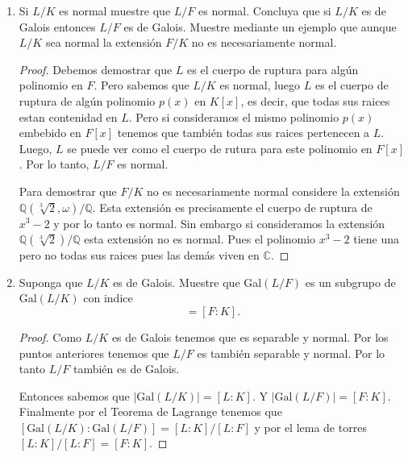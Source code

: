 \documentclass[letter,twoside,12pt]{article}
\begin{document}
\begin{enumerate}
\begin{enumerate}
\begin{proof}
Ahora para probar que $ L/F $ es separable tome cualquier elemento $ \alpha \in L $. Y tome el polinomio irreducible $ f(x) \in F[x] $. Pero si consideramos el polinomio irreducible $ k(x) $ de $ \alpha $ en $ K[x] $ tenemos que $ f(x)|k(x)  $. Luego, como $ k(x) $ no tiene raices repetidas concluimos que $ f(x) $ tampoco. Por lo tanto $ L/F $ es separable. 
\end{proof}

\item Si $ L/K $ es normal muestre que $ L/F $ es normal. Concluya que si $ L/K $ es de Galois entonces $ L/F $
es de Galois. Muestre mediante un ejemplo que aunque $ L/K $ sea normal la extensión $ F/K $ no es
necesariamente normal.

\begin{proof}
Debemos demostrar que $ L $ es el cuerpo de ruptura para algún polinomio en $ F $. Pero sabemos que $ L/K $ es normal, luego $ L $ es el cuerpo de ruptura de algún polinomio $ p(x) $ en $ K[x] $, es decir, que todas sus raices estan contenidad en $ L $. Pero si consideramos el mismo polinomio $ p(x) $ embebido en $ F[x] $ tenemos que también todas sus raices pertenecen a $ L $. Luego, $ L $ se puede ver como el cuerpo de rutura para este polinomio en $ F[x] $. Por lo tanto, $ L/F $ es normal.

Para demostrar que $ F/K $ no es necesariamente normal considere la extensión $ \mathbb{Q}(\sqrt[3]{2},\omega)/\mathbb{Q} $. Esta extensión es precisamente el cuerpo de ruptura de $ x^3-2 $ y por lo tanto es normal. Sin embargo si consideramos la extensión $ \mathbb{Q}(\sqrt[3]{2})/\mathbb{Q} $ esta extensión no es normal. Pues el polinomio $ x^3-2 $ tiene una pero no todas sus raices pues las demás viven en $ \mathbb{C} $.
\end{proof}

\item Suponga que $ L/K $ es de Galois. Muestre que Gal$ (L/F) $ es un subgrupo de Gal$ (L/K) $ con indice
\begin{equation}
[\text{Gal}(L/K) : \text{Gal}(L/F)] = [F : K]. \nonumber
\end{equation}

\begin{proof}
Como $ L/K $ es de Galois tenemos que es separable y normal. Por los puntos anteriores tenemos que $ L/F $ es también separable y normal. Por lo tanto $ L/F $ también es de Galois.

Entonces sabemos que $ |\text{Gal}(L/K)| = [L:K]  $. Y $ |\text{Gal}(L/F)|=[F:K] $. Finalmente por el Teorema de Lagrange tenemos que $ [\text{Gal}(L/K) : \text{Gal}(L/F)]=[L:K]/[L:F] $ y por el lema de torres $ [L:K]/[L:F]=[F:K] $.
\end{proof}


\end{enumerate}
\end{enumerate}
\end{document}
